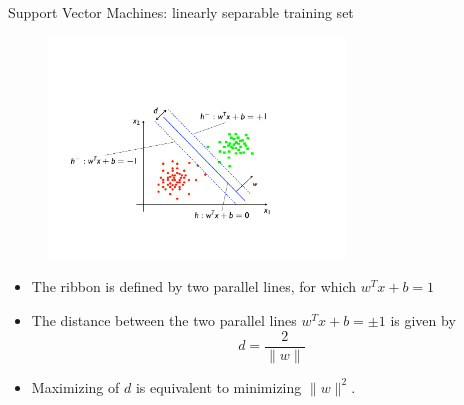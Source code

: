 \documentclass[xcolor=pdftex,dvipsnames,table]{beamer}
\begin{document}

\begin{frame}{Support Vector Machines: linearly separable training set}
	\begin{figure}[htb]
		\includegraphics[width=0.7\textwidth]{../graphics/SVM2.pdf}
	\end{figure}
	\begin{itemize}
		\item The ribbon is defined by two parallel lines, for which $w^Tx + b = 1$ 
		\item The distance between the two parallel lines $w^Tx + b = \pm 1$ is given by
		\begin{equation}
			d = \frac{2}{\|w\|}
		\end{equation}
		\item Maximizing of $d$ is equivalent to minimizing $\|w\|^2$.
	\end{itemize}
\end{frame}
\end{document}
